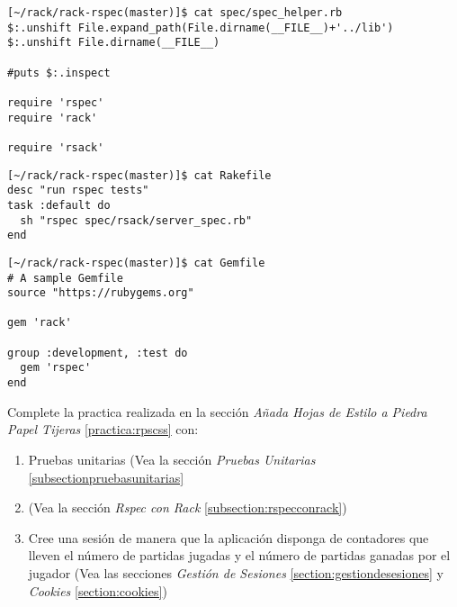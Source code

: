 \begin{verbatim}
[~/rack/rack-rspec(master)]$ cat spec/spec_helper.rb 
$:.unshift File.expand_path(File.dirname(__FILE__)+'../lib')
$:.unshift File.dirname(__FILE__)

#puts $:.inspect

require 'rspec'
require 'rack'

require 'rsack'
\end{verbatim}

\begin{verbatim}
[~/rack/rack-rspec(master)]$ cat Rakefile 
desc "run rspec tests"
task :default do
  sh "rspec spec/rsack/server_spec.rb"
end
\end{verbatim}

\begin{verbatim}
[~/rack/rack-rspec(master)]$ cat Gemfile
# A sample Gemfile
source "https://rubygems.org"

gem 'rack'

group :development, :test do
  gem 'rspec'
end
\end{verbatim}


\label{practica:rpsconsessionsypruebas}
Complete la practica realizada en la sección
{\it Añada Hojas de Estilo a Piedra Papel Tijeras}
\ref{practica:rpscss}
con:
\begin{enumerate}
\item 
 Pruebas unitarias (Vea la sección
{\it Pruebas Unitarias}
\ref{subsectionpruebasunitarias}
\item 
{}  (Vea la sección
{\it Rspec con Rack}
\ref{subsection:rspecconrack})
\item 
Cree una sesión de manera que la aplicación
disponga de  contadores que lleven el número de partidas jugadas y el número de partidas
ganadas por el jugador (Vea las secciones
{\it Gestión de Sesiones}
\ref{section:gestiondesesiones}
y
{\it Cookies}
\ref{section:cookies})
\end{enumerate}



\label{practica:despliegueenherokurps}

